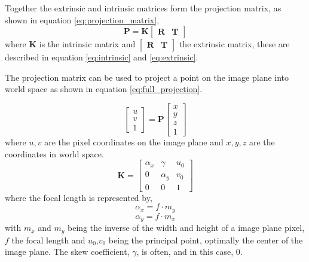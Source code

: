 \noindent
Together the extrinsic and intrinsic matrices form the projection matrix,
as shown in equation \ref{eq:projection_matrix},
\begin{equation} \label{eq:projection_matrix}
    \boldsymbol{P} = \boldsymbol{K}
    \begin{bmatrix}
        \boldsymbol{R} & \boldsymbol{T}
    \end{bmatrix}
\end{equation}
where \(\boldsymbol{K}\) is the intrinsic matrix and \(\begin{bmatrix} \boldsymbol{R} & \boldsymbol{T} \end{bmatrix}\) the extrinsic matrix, these are described
in equation \ref{eq:intrinsic} and \ref{eq:extrinsic}.

The projection matrix can be used to project a point on the image plane into world space as shown in equation \ref{eq:full_projection}.

\begin{equation} \label{eq:full_projection}
    \begin{bmatrix}
        u \\
        v \\
        1
    \end{bmatrix}
    = \boldsymbol{P}
    \begin{bmatrix}
        x \\
        y \\
        z \\
        1
    \end{bmatrix}
\end{equation}
where \(u,v\) are the pixel coordinates on the image plane and \(x,y,z\) are the coordinates in world space.
\begin{equation} \label{eq:intrinsic}
    \boldsymbol{K} =
    \begin{bmatrix}
        \alpha_x & \gamma   & u_0 \\
        0        & \alpha_y & v_0 \\
        0        & 0        & 1
    \end{bmatrix}
\end{equation}
where the focal length is represented by,
\[\alpha_x = f \cdot m_y\]
\[\alpha_y = f \cdot m_x\]
with \(m_x\) and \(m_y\) being the inverse of the width and height of a image plane pixel, \(f\) the focal length and \(u_0\),\(v_0\) being the principal point, optimally the center of the image plane.
The skew coefficient, \(\gamma\), is often, and in this case, 0.

